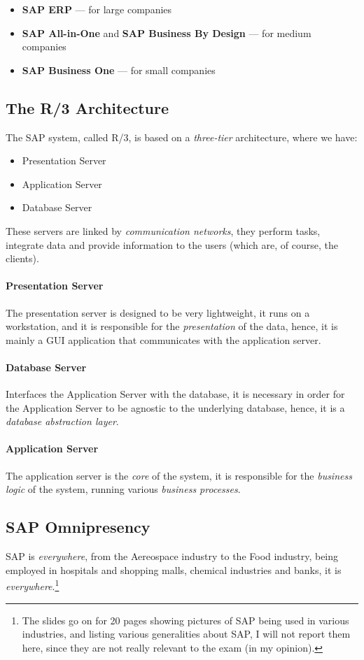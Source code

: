 \documentclass[openright, twoside, twocolumn, a4paper, 10pt]{report}
\begin{document}
\begin{itemize}
	\item \textbf{SAP ERP} --- for large companies
	\item \textbf{SAP All-in-One} and \textbf{SAP Business By Design} --- for medium companies
	\item \textbf{SAP Business One} --- for small companies
\end{itemize}

\subsection{The R/3 Architecture}

The SAP system, called R/3, is based on a \emph{three-tier} architecture,
where we have:

\begin{itemize}
	\item Presentation Server
	\item Application Server
	\item Database Server
\end{itemize}

These servers are linked by \emph{communication networks}, they perform tasks,
integrate data and provide information to the users (which are, of course, the clients).

\paragraph{Presentation Server}
The presentation server is designed to be very lightweight, it runs on a workstation,
and it is responsible for the \emph{presentation} of the data, hence, it is mainly
a GUI application that communicates with the application server.

\paragraph{Database Server}
Interfaces the Application Server with the database, it is necessary in order
for the Application Server to be agnostic to the underlying database, hence,
it is a \emph{database abstraction layer}.

\paragraph{Application Server}
The application server is the \emph{core} of the system, it is responsible
for the \emph{business logic} of the system, running various \emph{business processes}.

\subsection{SAP Omnipresency}

SAP is \emph{everywhere}, from the Aereospace industry to the Food industry, being employed
in hospitals and shopping malls, chemical industries and banks, it is \emph{everywhere}.\footnote{
	The slides go on for 20 pages showing pictures of SAP being used in various industries,
	and listing various generalities about SAP, I will not report them here, since they are
	not really relevant to the exam (in my opinion).
}
\end{document}
